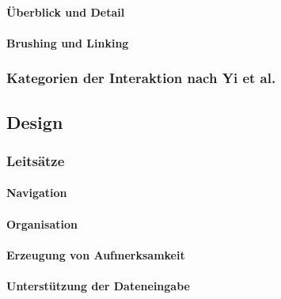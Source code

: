                 \paragraph{Überblick und Detail} %

                \paragraph{Brushing und Linking} %

            \subsubsection{Kategorien der Interaktion nach Yi et al.} %

        \subsection{Design} %

            \subsubsection{Leitsätze} %

                \paragraph{Navigation} %

                \paragraph{Organisation} %

                \paragraph{Erzeugung von Aufmerksamkeit} %

                \paragraph{Unterstützung der Dateneingabe} %

